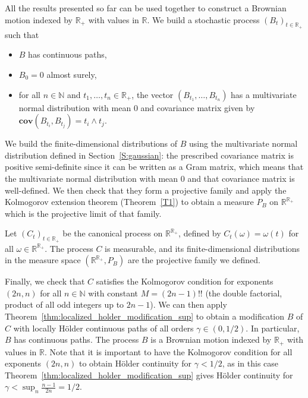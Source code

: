 \documentclass[lean]{Draft}
\begin{document}
All the results presented so far can be used together to construct a Brownian motion indexed by $\mathbb{R}_+$ with values in $\mathbb{R}$.
We build a stochastic process $(B_t)_{t \in \mathbb{R}_+}$ such that
\begin{itemize}
  \item $B$ has continuous paths,
  \item $B_0 = 0$ almost surely,
  \item for all $n \in \mathbb{N}$ and $t_1, \ldots, t_n \in \mathbb{R}_+$, the vector $(B_{t_1}, \ldots, B_{t_n})$ has a multivariate normal distribution with mean $0$ and covariance matrix given by $\mathbf{cov}(B_{t_i}, B_{t_j}) = t_i \wedge t_j$.
\end{itemize}

We build the finite-dimensional distributions of $B$ using the multivariate normal distribution defined in Section~\ref{S:gaussian}: the prescribed covariance matrix is positive semi-definite since it can be written as a Gram matrix, which means that the multivariate normal distribution with mean 0 and that covariance matrix is well-defined.
We then check that they form a projective family and apply the Kolmogorov extension theorem (Theorem~\ref{T1}) to obtain a measure $P_B$ on $\mathbb{R}^{\mathbb{R}_+}$ which is the projective limit of that family.

Let $(C_t)_{t \in \mathbb{R}_+}$ be the canonical process on $\mathbb{R}^{\mathbb{R}_+}$, defined by $C_t(\omega) = \omega(t)$ for all $\omega \in \mathbb{R}^{\mathbb{R}_+}$.
The process $C$ is measurable, and its finite-dimensional distributions in the measure space $(\mathbb{R}^{\mathbb{R}_+}, P_B)$ are the projective family we defined.

Finally, we check that $C$ satisfies the Kolmogorov condition for exponents $(2n, n)$ for all $n \in \mathbb{N}$ with constant $M = (2n - 1)!!$ (the double factorial, product of all odd integers up to $2n - 1$). We can then apply Theorem~\ref{thm:localized_holder_modification_sup} to obtain a modification $B$ of $C$ with locally Hölder continuous paths of all orders $\gamma \in (0, 1/2)$.
In particular, $B$ has continuous paths.
The process $B$ is a Brownian motion indexed by $\mathbb{R}_+$ with values in $\mathbb{R}$.
Note that it is important to have the Kolmogorov condition for all exponents $(2n, n)$ to obtain Hölder continuity for $\gamma < 1/2$, as in this case Theorem~\ref{thm:localized_holder_modification_sup} gives Hölder continuity for $\gamma < \sup_n \frac{n-1}{2n} = 1/2$.
\end{document}
